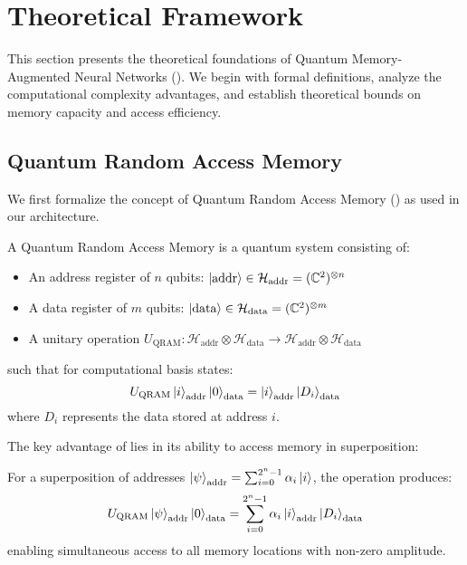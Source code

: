\section{Theoretical Framework}
\label{sec:theory}

This section presents the theoretical foundations of Quantum Memory-Augmented Neural Networks (\qmnn). We begin with formal definitions, analyze the computational complexity advantages, and establish theoretical bounds on memory capacity and access efficiency.

\subsection{Quantum Random Access Memory}

We first formalize the concept of Quantum Random Access Memory (\qram) as used in our architecture.

\begin{definition}
\label{def:qram}
A Quantum Random Access Memory is a quantum system consisting of:
\begin{itemize}
    \item An address register of $n$ qubits: $\left|\text{addr}\right\rangle \in \mathcal{H}_{\text{addr}} = (\mathbb{C}^2)^{\otimes n}$
    \item A data register of $m$ qubits: $\left|\text{data}\right\rangle \in \mathcal{H}_{\text{data}} = (\mathbb{C}^2)^{\otimes m}$
    \item A unitary operation $U_{\text{QRAM}}: \mathcal{H}_{\text{addr}} \otimes \mathcal{H}_{\text{data}} \rightarrow \mathcal{H}_{\text{addr}} \otimes \mathcal{H}_{\text{data}}$
\end{itemize}
such that for computational basis states:
$$U_{\text{QRAM}} \left|i\right\rangle_{\text{addr}} \left|0\right\rangle_{\text{data}} = \left|i\right\rangle_{\text{addr}} \left|D_i\right\rangle_{\text{data}}$$
where $D_i$ represents the data stored at address $i$.
\end{definition}

The key advantage of \qram lies in its ability to access memory in superposition:

\begin{theorem}
\label{thm:superposition_access}
For a superposition of addresses $\left|\psi\right\rangle_{\text{addr}} = \sum_{i=0}^{2^n-1} \alpha_i \left|i\right\rangle$, the \qram operation produces:
$$U_{\text{QRAM}} \left|\psi\right\rangle_{\text{addr}} \left|0\right\rangle_{\text{data}} = \sum_{i=0}^{2^n-1} \alpha_i \left|i\right\rangle_{\text{addr}} \left|D_i\right\rangle_{\text{data}}$$
enabling simultaneous access to all memory locations with non-zero amplitude.
\end{theorem}


